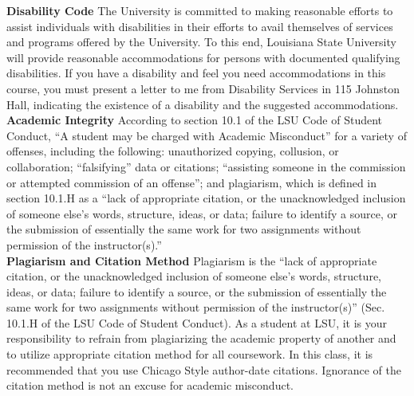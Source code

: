 \documentclass[11pt,article,oneside]{memoir}
\begin{document}
\noindent \textbf{Disability Code}
The University is committed to making reasonable efforts to assist individuals with disabilities in
their efforts to avail themselves of services and programs offered by the University. To this end,
Louisiana State University will provide reasonable accommodations for persons with
documented qualifying disabilities. If you have a disability and feel you need accommodations in
this course, you must present a letter to me from Disability Services in 115 Johnston Hall,
indicating the existence of a disability and the suggested accommodations.\\

\noindent \textbf{Academic Integrity}
According to section 10.1 of the LSU Code of Student Conduct, ``A student may be charged with Academic Misconduct'' for a variety of offenses, including the following: unauthorized copying, collusion, or collaboration; ``falsifying'' data or citations; ``assisting someone in the commission or attempted commission of an offense''; and plagiarism, which is defined in section 10.1.H as a ``lack of appropriate citation, or the unacknowledged inclusion of someone else's words, structure, ideas, or data; failure to identify a source, or the submission of essentially the same work for two assignments without permission of the instructor(s).''\\

\noindent \textbf{Plagiarism and Citation Method}
Plagiarism is the ``lack of appropriate citation, or the unacknowledged inclusion of someone else's words, structure, ideas, or data; failure to identify a source, or the submission of essentially the same work for two assignments without permission of the instructor(s)'' (Sec. 10.1.H of the LSU Code of Student Conduct). As a student at LSU, it is your responsibility to refrain from plagiarizing the academic property of another and to utilize appropriate citation method for all coursework. In this class, it is recommended that you use Chicago Style author-date citations. Ignorance of the citation method is not an excuse for academic misconduct.
\end{document}
